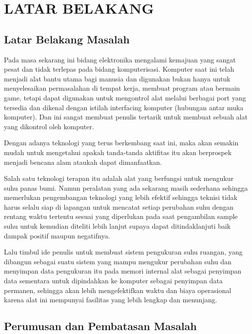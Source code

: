 \documentclass{jtetiproposalskripsi}
\begin{document}
\chapter{LATAR BELAKANG}

\section{Latar Belakang Masalah}
Pada masa sekarang ini bidang elektronika mengalami kemajuan yang sangat pesat dan tidak terlepas pada bidang komputerisasi. Komputer saat ini telah menjadi alat bantu utama bagi manusia dan digunakan bukan hanya untuk menyelesaikan permasalahan di tempat kerja, membuat program atau bermain game, tetapi dapat digunakan untuk mengontrol alat melalui berbagai port yang tersedia dan dikenal dengan istilah interfacing komputer (hubungan antar muka komputer). Dan ini sangat membuat penulis tertarik untuk membuat sebuah alat yang dikontrol oleh komputer. 



Dengan adanya teknologi yang terus berkembang saat ini, maka akan semakin mudah untuk mengetahui apakah tanda-tanda aktifitas itu akan berprospek menjadi bencana alam ataukah dapat dimanfaatkan. 



Salah satu teknologi terapan itu adalah alat yang berfungsi untuk mengukur suhu panas bumi. Namun peralatan yang ada sekarang masih sederhana sehingga memerlukan pengembangan teknologi yang lebih efektif sehingga teknisi tidak harus selalu siap di lapangan untuk mencatat setiap perubahan suhu dengan rentang waktu tertentu sesuai yang diperlukan pada saat pengambilan sample suhu untuk kemudian diteliti lebih lanjut supaya dapat ditindaklanjuti baik dampak positif maupun negatifnya.



Lalu timbul ide penulis untuk membuat sistem pengukuran suhu ruangan, yang dibangun sebagai suatu sistem  yang mampu mengukur perubahan suhu dan menyimpan data pengukuran itu pada memori internal alat sebagai penyimpan data sementara untuk dipindahkan ke komputer sebagai penyimpan data permanen, sehingga akan lebih mengefektifkan waktu dan biaya operasional karena alat ini mempunyai fasilitas yang lebih lengkap dan menunjang.



\section{Perumusan dan Pembatasan Masalah}
\end{document}
